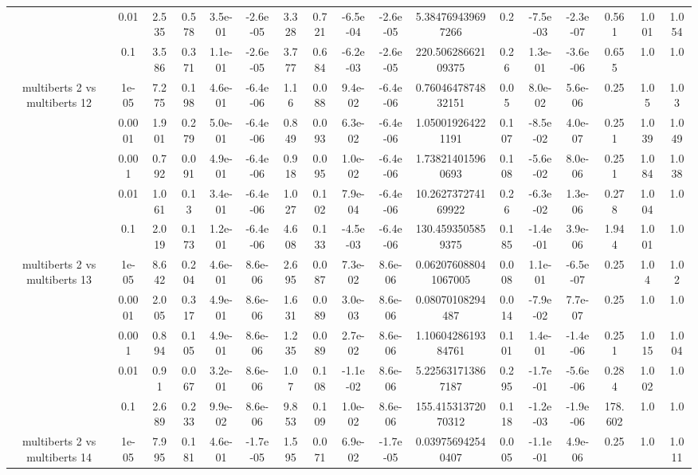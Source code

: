 \begin{tabular}{|c|c|c|c|c|c|c|c|c|c|c|c|c|c|c|c|c|}
 & 0.01 & 2.535 & 0.578 & 3.5e-01 & -2.6e-05 & 3.328 & 0.721 & -6.5e-04 & -2.6e-05 & 5.384769439697266 & 0.2 & -7.5e-03 & -2.3e-07 & 0.561 & 1.001 & 1.054 \\
 & 0.1 & 3.586 & 0.371 & 1.1e-01 & -2.6e-05 & 3.777 & 0.684 & -6.2e-03 & -2.6e-05 & 220.50628662109375 & 0.26 & 1.3e-01 & -3.6e-06 & 0.655 & 1.0 & 1.0 \\
\hline
\multirow{5}{*}{multiberts 2 vs multiberts 12} & 1e-05 & 7.275 & 0.198 & 4.6e-01 & -6.4e-06 & 1.16 & 0.088 & 9.4e-02 & -6.4e-06 & 0.7604647874832151 & 0.05 & 8.0e-02 & 5.6e-06 & 0.25 & 1.05 & 1.03 \\
 & 0.0001 & 1.901 & 0.279 & 5.0e-01 & -6.4e-06 & 0.849 & 0.093 & 6.3e-02 & -6.4e-06 & 1.050019264221191 & 0.107 & -8.5e-02 & 4.0e-07 & 0.251 & 1.039 & 1.049 \\
 & 0.001 & 0.792 & 0.091 & 4.9e-01 & -6.4e-06 & 0.918 & 0.095 & 1.0e-02 & -6.4e-06 & 1.738214015960693 & 0.108 & -5.6e-02 & 8.0e-06 & 0.251 & 1.084 & 1.038 \\
 & 0.01 & 1.061 & 0.13 & 3.4e-01 & -6.4e-06 & 1.027 & 0.102 & 7.9e-04 & -6.4e-06 & 10.262737274169922 & 0.26 & -6.3e-02 & 1.3e-06 & 0.278 & 1.004 & 1.0 \\
 & 0.1 & 2.019 & 0.173 & 1.2e-01 & -6.4e-06 & 4.608 & 0.133 & -4.5e-03 & -6.4e-06 & 130.4593505859375 & 0.185 & -1.4e-01 & 3.9e-06 & 1.944 & 1.001 & 1.0 \\
\hline
\multirow{5}{*}{multiberts 2 vs multiberts 13} & 1e-05 & 8.642 & 0.204 & 4.6e-01 & 8.6e-06 & 2.695 & 0.087 & 7.3e-02 & 8.6e-06 & 0.062076088041067005 & 0.008 & 1.1e-01 & -6.5e-07 & 0.25 & 1.04 & 1.02 \\
 & 0.0001 & 2.005 & 0.317 & 4.9e-01 & 8.6e-06 & 1.631 & 0.089 & 3.0e-03 & 8.6e-06 & 0.08070108294487 & 0.014 & -7.9e-02 & 7.7e-07 & 0.25 & 1.0 & 1.0 \\
 & 0.001 & 0.894 & 0.105 & 4.9e-01 & 8.6e-06 & 1.235 & 0.089 & 2.7e-02 & 8.6e-06 & 1.1060428619384761 & 0.101 & 1.4e-01 & -1.4e-06 & 0.251 & 1.015 & 1.004 \\
 & 0.01 & 0.91 & 0.067 & 3.2e-01 & 8.6e-06 & 1.07 & 0.108 & -1.1e-02 & 8.6e-06 & 5.225631713867187 & 0.295 & -1.7e-01 & -5.6e-06 & 0.284 & 1.002 & 1.0 \\
 & 0.1 & 2.689 & 0.233 & 9.9e-02 & 8.6e-06 & 9.853 & 0.109 & 1.0e-02 & 8.6e-06 & 155.41531372070312 & 0.118 & -1.2e-03 & -1.9e-06 & 178.602 & 1.0 & 1.0 \\
\hline
\multirow{5}{*}{multiberts 2 vs multiberts 14} & 1e-05 & 7.995 & 0.181 & 4.6e-01 & -1.7e-05 & 1.595 & 0.071 & 6.9e-02 & -1.7e-05 & 0.039756942540407 & 0.005 & -1.1e-01 & 4.9e-06 & 0.25 & 1.0 & 1.011 \\

\end{tabular}
